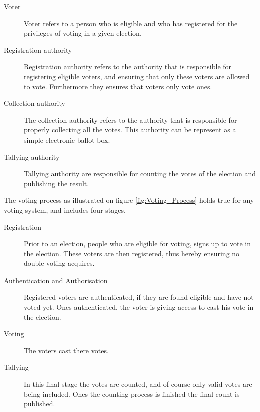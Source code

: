 \begin{description}
    \item[Voter] Voter refers to a person who is eligible and who has registered for the privileges of voting in a given election. 
        
    \item[Registration authority] Registration authority refers to the authority that is responsible for registering eligible voters, and ensuring that only these voters are allowed to vote. Furthermore they ensures that voters only vote ones. 
        
    \item[Collection authority] The collection authority refers to the authority that is responsible for properly collecting all the votes. This authority can be represent as a simple electronic ballot box.

    \item[Tallying authority] Tallying authority are responsible for counting the votes of the election and publishing the result. 
\end{description}


\noindent
The voting process as illustrated on figure \ref{fig:Voting_Process} holds true for any voting system, and includes four stages. 

\begin{description}
    \item[Registration] Prior to an election, people who are eligible for voting, signs up to vote in the election. These voters are then registered, thus hereby ensuring no double voting acquires.
        
    \item[Authentication and Authorisation] Registered voters are authenticated, if they are found eligible and have not voted yet. Ones authenticated, the voter is giving access to cast his vote in the election.  
        
    \item[Voting] The voters cast there votes. 

    \item[Tallying] In this final stage the votes are counted, and of course only valid votes are being included. Ones the counting process is finished the final count is published. 
\end{description}


